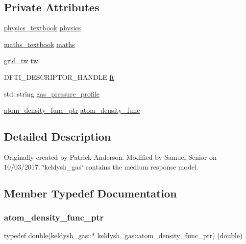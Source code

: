 \subsection*{Private Attributes}
\begin{DoxyCompactItemize}
\item 
\hyperlink{classphysics__textbook}{physics\+\_\+textbook} \hyperlink{classkeldysh__gas_a3b26e27ccf042ae2f89aa23e4252acf4}{physics}
\item 
\hyperlink{classmaths__textbook}{maths\+\_\+textbook} \hyperlink{classkeldysh__gas_a501614b541b9056bb05b378a39962524}{maths}
\item 
\hyperlink{classgrid__tw}{grid\+\_\+tw} \hyperlink{classkeldysh__gas_a1cd7129f9ba9d62f4084049e529cab49}{tw}
\item 
D\+F\+T\+I\+\_\+\+D\+E\+S\+C\+R\+I\+P\+T\+O\+R\+\_\+\+H\+A\+N\+D\+LE \hyperlink{classkeldysh__gas_ac635d55dcbdfcde7c34d77de5cd75af6}{ft}
\item 
std\+::string \hyperlink{classkeldysh__gas_a8e25aa7daf8df877e12db565294c3c72}{gas\+\_\+pressure\+\_\+profile}
\item 
\hyperlink{classkeldysh__gas_ab47ad59b466eee349a7500555869b988}{atom\+\_\+density\+\_\+func\+\_\+ptr} \hyperlink{classkeldysh__gas_aeb540c2cc32a862ab074638d53f172f7}{atom\+\_\+density\+\_\+func}
\end{DoxyCompactItemize}


\subsection{Detailed Description}
Originally created by Patrick Anderson. Modified by Samuel Senior on 10/03/2017. \char`\"{}keldysh\+\_\+gas\char`\"{} contains the medium response model. 

\subsection{Member Typedef Documentation}
\mbox{\label{classkeldysh__gas_ab47ad59b466eee349a7500555869b988}} 
\subsubsection{\texorpdfstring{atom\+\_\+density\+\_\+func\+\_\+ptr}{atom\_density\_func\_ptr}}
{\footnotesize\ttfamily typedef double(keldysh\+\_\+gas\+::$\ast$ keldysh\+\_\+gas\+::atom\+\_\+density\+\_\+func\+\_\+ptr) (double)\hspace{0.3cm}{\ttfamily [private]}}



